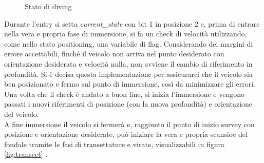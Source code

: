 \documentclass{article}
\begin{document}
            \begin{figure} [ht]
                \caption{Stato di diving}
                \label{fig:diving}
            \end{figure}

            Durante l'entry si setta \emph{current\_state} con bit 1 in posizione 2 e, prima di entrare  nella vera e propria fase di immersione, 
            si fa un check di velocità utilizzando, come nello stato positioning, una variabile di flag. Considerando dei margini di errore accettabili,
            finché il veicolo non arriva nel punto desiderato con orientazione desiderata e velocità nulla, 
            non avviene il cambio di riferimento in profondità. Si è decisa questa implementazione per assicurarci
            che il veicolo sia ben posizionato e fermo sul punto di immersione, così da minimizzare gli errori.\\
            Una volta che il check è andato a buon fine, si inizia l'immersione e vengono passati i nuovi riferimenti
            di posizione (con la nuova profondità) e orientazione del veicolo. \\
            A fine immersione il veicolo si fermerà e, raggiunto il punto di inizio survey con posizione
            e orientazione desiderate, può iniziare la vera e propria scansioe del fondale tramite le fasi di transettature e virate, visualizzabili in figura \ref{fig:transect} .
\end{document}
